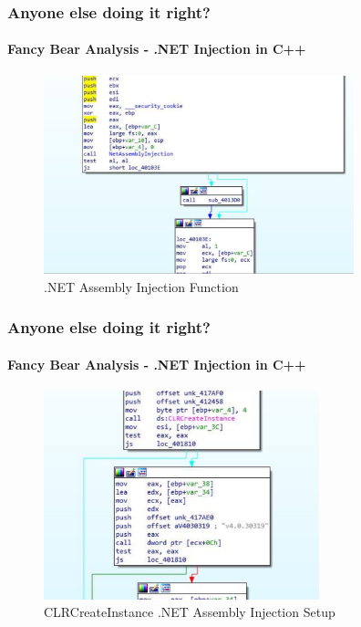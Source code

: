 \documentclass[aspectratio=169]{beamer}
\begin{document}
\begin{frame}
  \frametitle{Anyone else doing it right?}
  \framesubtitle{Fancy Bear Analysis - .NET Injection in C++}
  \begin{center}
    \begin{figure}
      \includegraphics[width=9cm,keepaspectratio]{fancy_bear_analysis_1}
      \caption{.NET Assembly Injection Function}
    \end{figure}
  \end{center}
\end{frame}

\begin{frame}
  \frametitle{Anyone else doing it right?}
  \framesubtitle{Fancy Bear Analysis - .NET Injection in C++}
  \begin{center}
    \begin{figure}
      \includegraphics[width=8cm,keepaspectratio]{fancy_bear_analysis_2}
      \caption{CLRCreateInstance .NET Assembly Injection Setup}
    \end{figure}
  \end{center}
\end{frame}
\end{document}
